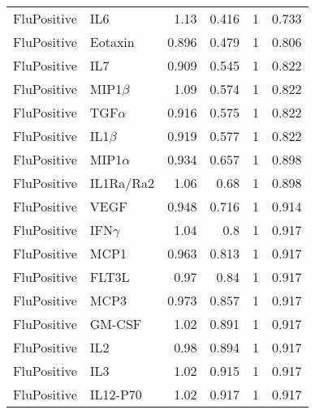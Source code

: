 \documentclass[10pt]{article}
\begin{document}
\begin{longtable}{llrrrr}
 FluPositive &           IL6 &  1.13 &    0.416 &       1 &   0.733 \\
 FluPositive &       Eotaxin & 0.896 &    0.479 &       1 &   0.806 \\
 FluPositive &           IL7 & 0.909 &    0.545 &       1 &   0.822 \\
 FluPositive &   MIP1$\beta$ &  1.09 &    0.574 &       1 &   0.822 \\
 FluPositive &   TGF$\alpha$ & 0.916 &    0.575 &       1 &   0.822 \\
 FluPositive &    IL1$\beta$ & 0.919 &    0.577 &       1 &   0.822 \\
 FluPositive &  MIP1$\alpha$ & 0.934 &    0.657 &       1 &   0.898 \\
 FluPositive &     IL1Ra/Ra2 &  1.06 &     0.68 &       1 &   0.898 \\
 FluPositive &          VEGF & 0.948 &    0.716 &       1 &   0.914 \\
 FluPositive &   IFN$\gamma$ &  1.04 &      0.8 &       1 &   0.917 \\
 FluPositive &          MCP1 & 0.963 &    0.813 &       1 &   0.917 \\
 FluPositive &         FLT3L &  0.97 &     0.84 &       1 &   0.917 \\
 FluPositive &          MCP3 & 0.973 &    0.857 &       1 &   0.917 \\
 FluPositive &        GM-CSF &  1.02 &    0.891 &       1 &   0.917 \\
 FluPositive &           IL2 &  0.98 &    0.894 &       1 &   0.917 \\
 FluPositive &           IL3 &  1.02 &    0.915 &       1 &   0.917 \\
 FluPositive &      IL12-P70 &  1.02 &    0.917 &       1 &   0.917 \\
\end{longtable}
\end{document}
